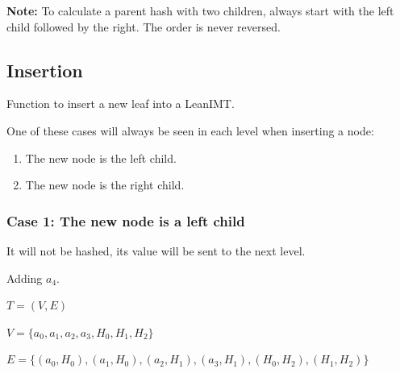 \documentclass{article}
\begin{document}
\textbf{Note:} To calculate a parent hash with two children, always start with the left child followed by the right. The order is never reversed.


\subsection{Insertion}

Function to insert a new leaf into a LeanIMT.

One of these cases will always be seen in each level when inserting a node:

\begin{enumerate}
    \item The new node is the left child.
    \item The new node is the right child.
\end{enumerate}


\subsubsection*{Case 1: The new node is a left child}

It will not be hashed, its value will be sent to the next level.

Adding $a_4$.

$T = (V,E)$

\raggedright

$V = \{a_0, a_1, a_2, a_3, H_0, H_1, H_2\}$

$E = \{(a_0, H_0), (a_1, H_0), (a_2, H_1), (a_3, H_1), (H_0, H_2), (H_1, H_2)\}$
\end{document}
